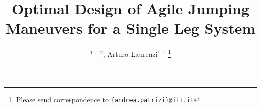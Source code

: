 \documentclass[letterpaper, 10 pt, conference]{ieeeconf}  %
\begin{document}
\title{\LARGE \bf
Optimal Design of Agile Jumping Maneuvers for a Single Leg System
}

\author{$^{1\,-\,2}$, Arturo Laurenzi$^{1}$ $^1$
\thanks{  Please send correspondence to \tt\scriptsize \{andrea.patrizi\}@iit.it}}
\author{%
}
\end{document}
